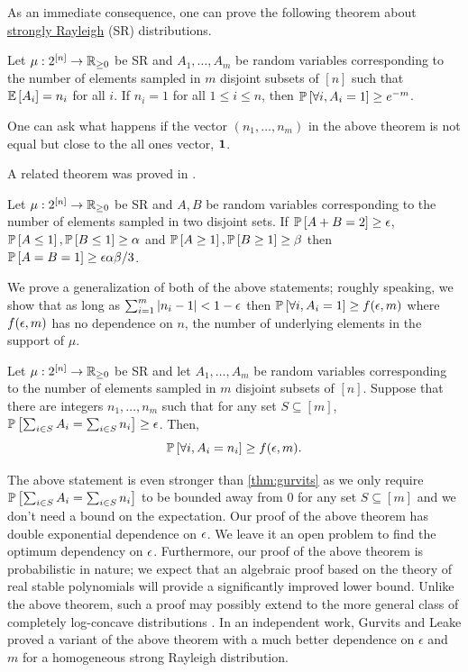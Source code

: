 As an immediate consequence, one can prove the following theorem about \hyperlink{tar:SR}{strongly Rayleigh} (SR) distributions.
\begin{theorem}\label{thm:gurvits}
Let $\mu:2^{[n]}\to\R_{\geq 0}$ be SR and $A_1,\dots,A_m$ be random variables corresponding to the number of elements sampled in $m$ disjoint subsets of $[n]$ such that $\E{A_i}=n_i$ for all $i$. If $n_i=1$ for all $1\leq i\leq n$, then $\P{\forall i, A_i=1}\geq e^{-m}$.
\end{theorem}
One can ask what happens if the vector $(n_1,\dots,n_m)$  in the above theorem is not equal but close to the all ones vector, $\bone$. 

A related theorem was proved in \cite{OSS11}.
\begin{theorem}
Let $\mu:2^{[n]}\to\R_{\geq 0}$ be SR and $A,B$ be random variables corresponding to the number of elements sampled in two disjoint sets. If $\P{A+B=2}\geq \eps$, $\P{A\leq 1},\P{B\leq 1}\geq \alpha$ and $\P{A\geq 1},\P{B\geq 1}\geq \beta$ then $\P{A=B=1}\geq \eps\alpha\beta/3$.
\end{theorem}

We prove a generalization of both of the above statements; roughly speaking, we show that as long as $\sum_{i=1}^m |n_i-1| <1-\eps$ then $\P{\forall i, A_i=1}\geq f(\eps,m)$ where $f(\eps,m)$ has no dependence on $n$, the number of underlying elements in the support of $\mu$. 
\begin{theorem}\label{thm:gurinf}
Let $\mu:2^{[n]}\to\R_{\geq 0}$ be SR and let $A_1,\dots,A_m$ be random variables corresponding to the number of elements sampled in $m$ disjoint subsets of $[n]$. Suppose that there are integers $n_1,\dots,n_m$ such that for any set $S\subseteq [m]$, $\P{\sum_{i\in S} A_i=\sum_{i\in S} n_i}\geq \eps$. Then, 
$$\P{\forall i, A_i=n_i}\geq f(\eps,m).$$
\end{theorem}
The above statement is even  stronger than \cref{thm:gurvits} as we only require $\P{\sum_{i\in S} A_i=\sum_{i\in S} n_i}$  to be bounded away from $0$ for any set $S\subseteq [m]$ and we don't need a bound on the expectation.
Our proof of the above theorem has double exponential dependence on $\eps$. We leave it an open problem to find the optimum dependency on $\eps$. Furthermore, our proof of the above theorem is probabilistic in nature; we expect that an algebraic proof based on the theory of real stable polynomials will provide a significantly improved lower bound. Unlike the above theorem, such a proof may  possibly extend to the more general class of completely log-concave distributions \cite{AOV18}. In an independent work, Gurvits and Leake \cite{GL21} proved a variant of the above theorem with a much better dependence on $\epsilon$ and $m$ for a homogeneous strong Rayleigh distribution.

